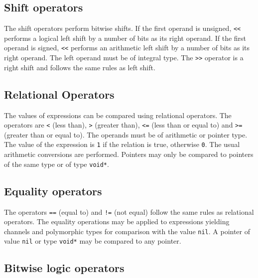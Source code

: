 \hypertarget{shift-operators}{%
\subsection{Shift operators}\label{shift-operators}}

The shift operators perform bitwise shifts. If the first operand is
unsigned, \passthrough{\lstinline!<<!} performs a logical left shift by
a number of bits as its right operand. If the first operand is signed,
\passthrough{\lstinline!<<!} performs an arithmetic left shift by a
number of bits as its right operand. The left operand must be of
integral type. The \passthrough{\lstinline!>>!} operator is a right
shift and follows the same rules as left shift.

\hypertarget{relational-operators}{%
\subsection{Relational Operators}\label{relational-operators}}

The values of expressions can be compared using relational operators.
The operators are \passthrough{\lstinline!<!} (less than),
\passthrough{\lstinline!>!} (greater than), \passthrough{\lstinline!<=!}
(less than or equal to) and \passthrough{\lstinline!>=!} (greater than
or equal to). The operands must be of arithmetic or pointer type. The
value of the expression is \passthrough{\lstinline!1!} if the relation
is true, otherwise \passthrough{\lstinline!0!}. The usual arithmetic
conversions are performed. Pointers may only be compared to pointers of
the same type or of type \passthrough{\lstinline!void*!}.

\hypertarget{equality-operators}{%
\subsection{Equality operators}\label{equality-operators}}

The operators \passthrough{\lstinline!==!} (equal to) and
\passthrough{\lstinline"!="} (not equal) follow the same rules as
relational operators. The equality operations may be applied to
expressions yielding channels and polymorphic types for comparison with
the value \passthrough{\lstinline!nil!}. A pointer of value
\passthrough{\lstinline!nil!} or type \passthrough{\lstinline!void*!}
may be compared to any pointer.

\hypertarget{bitwise-logic-operators}{%
\subsection{Bitwise logic operators}\label{bitwise-logic-operators}}


